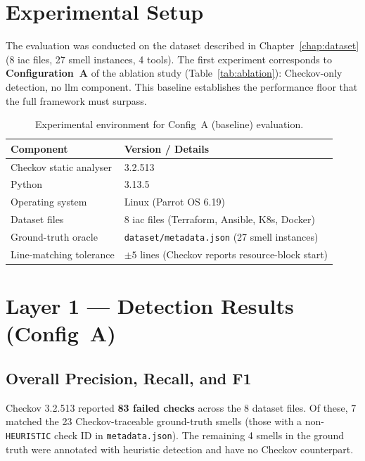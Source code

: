 \documentclass[12pt, a4paper]{report}
\begin{document}
\section{Experimental Setup}

The evaluation was conducted on the dataset described in Chapter~\ref{chap:dataset}
(8 \gls{iac} files, 27 smell instances, 4 tools).
The first experiment corresponds to \textbf{Configuration~A} of the ablation study
(Table~\ref{tab:ablation}): Checkov-only detection, no \gls{llm} component.
This baseline establishes the performance floor that the full framework must surpass.

\begin{table}[H]
  \centering
  \caption{Experimental environment for Config~A (baseline) evaluation.}
  \label{tab:env}
  \begin{tabular}{ll}
    \toprule
    \textbf{Component} & \textbf{Version / Details} \\
    \midrule
    Checkov static analyser & 3.2.513 \\
    Python & 3.13.5 \\
    Operating system & Linux (Parrot OS 6.19) \\
    Dataset files & 8 \gls{iac} files (Terraform, Ansible, K8s, Docker) \\
    Ground-truth oracle & \texttt{dataset/metadata.json} (27 smell instances) \\
    Line-matching tolerance & $\pm 5$ lines (Checkov reports resource-block start) \\
    \bottomrule
  \end{tabular}
\end{table}

\section{Layer 1 --- Detection Results (Config~A)}

\subsection{Overall Precision, Recall, and F1}

Checkov 3.2.513 reported \textbf{83 failed checks} across the 8 dataset files.
Of these, 7 matched the 23 Checkov-traceable ground-truth smells
(those with a non-\texttt{HEURISTIC} check ID in \texttt{metadata.json}).
The remaining 4 smells in the ground truth were annotated with heuristic detection
and have no Checkov counterpart.
\end{document}
